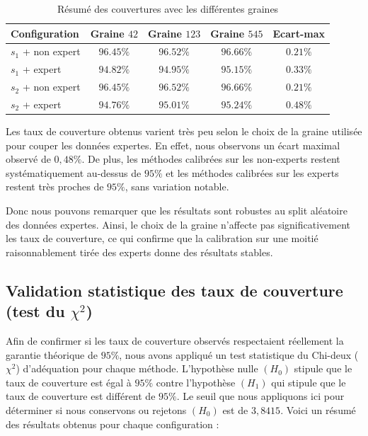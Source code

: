 \documentclass[a4paper,12pt]{article}
\begin{document}
\begin{table}[h]
    \centering
    \begin{tabular}{|l|c|c|c|c|}
        \hline
        \textbf{Configuration} & \textbf{Graine $42$} & \textbf{Graine $123$} & \textbf{Graine $545$} & \textbf{Ecart-max} \\
        \hline
        $s_1$ + non expert & $96.45\%$ & $96.52\%$ & $96.66\%$ & $0.21\%$ \\
        $s_1$ + expert & $94.82\%$ & $94.95\%$ & $95.15\%$ & $0.33\%$ \\
        $s_2$ + non expert & $96.45\%$ & $96.52\%$ & $96.66\%$ & $0.21\%$ \\
        $s_2$ + expert & $94.76\%$ & $95.01\%$ & $95.24\%$ & $0.48\%$ \\
        \hline
    \end{tabular}
    \caption{Résumé des couvertures avec les différentes graines}
    \label{tab:couvertures_graines}
\end{table}

Les taux de couverture obtenus varient très peu selon le choix de la graine utilisée pour couper les données expertes. En effet, nous observons un écart maximal observé de $0,48\%$. De plus, les méthodes calibrées sur les non-experts restent systématiquement au-dessus de $95\%$ et les méthodes calibrées sur les experts restent très proches de $95\%$, sans variation notable.

\vspace{0.2cm}

Donc nous pouvons remarquer que les résultats sont robustes au split aléatoire des données expertes. Ainsi, le choix de la graine n’affecte pas significativement les taux de couverture, ce qui confirme que la calibration sur une moitié raisonnablement tirée des experts donne des résultats stables.

\subsection{Validation statistique des taux de couverture (test du $\chi^2$)}

Afin de confirmer si les taux de couverture observés respectaient réellement la garantie théorique de $95\%$, nous avons appliqué un test statistique du Chi-deux ($\chi^2$) d’adéquation pour chaque méthode. L’hypothèse nulle $(H_0)$ stipule que le taux de couverture est égal à $95\%$ contre l'hypothèse $(H_1)$ qui stipule que le taux de couverture est différent de $95\%$. Le seuil que nous appliquons ici pour déterminer si nous conservons ou rejetons $(H_0)$ est de $3,8415$. Voici un résumé des résultats obtenus pour chaque configuration :
\end{document}
